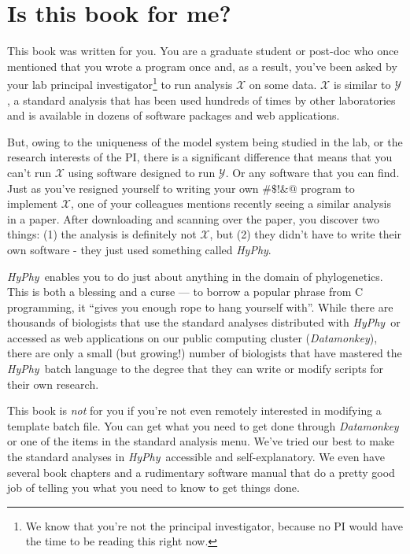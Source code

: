 \documentclass[12pt]{book}
\newcommand{\hyphy}{\textit{HyPhy}}
\begin{document}

\section {Is this book for me?}

This book was written for you.  You are a graduate student or post-doc who once mentioned that you wrote a program once and, as a result, you've been asked by your lab principal investigator\footnote{We know that you're not the principal investigator, because no PI would have the time to be reading this right now.} to run analysis $\mathcal{X}$ on some data.  $\mathcal{X}$ is similar to $\mathcal{Y}$, a standard analysis that has been used hundreds of times by other laboratories and is available in dozens of software packages and web applications.  

But, owing to the uniqueness of the model system being studied in the lab, or the research interests of the PI, there is a significant difference that means that you can't run $\mathcal{X}$ using software designed to run $\mathcal{Y}$.  Or any software that you can find.  Just as you've resigned yourself to writing your own $\#\$!\&@$ program to implement $\mathcal{X}$, one of your colleagues mentions recently seeing a similar analysis in a paper.  After downloading and scanning over the paper, you discover two things: (1) the analysis is definitely not $\mathcal{X}$, but (2) they didn't have to write their own software - they just used something called {\it HyPhy}.  

\hyphy\ enables you to do just about anything in the domain of phylogenetics.  This is both a blessing and a curse --- to borrow a popular phrase from C programming, it ``gives you enough rope to hang yourself with''.  While there are thousands of biologists that use the standard analyses distributed with \hyphy\ or accessed as web applications on our public computing cluster ({\it Datamonkey}), there are only a small (but growing!) number of biologists that have mastered the \hyphy\ batch language to the degree that they can write or modify scripts for their own research.  

This book is {\it not} for you if you're not even remotely interested in modifying a template batch file.  You can get what you need to get done through {\it Datamonkey} or one of the items in the standard analysis menu.  We've tried our best to make the standard analyses in \hyphy\ accessible and self-explanatory.  We even have several book chapters and a rudimentary software manual that do a pretty good job of telling you what you need to know to get things done.  
\end{document}

